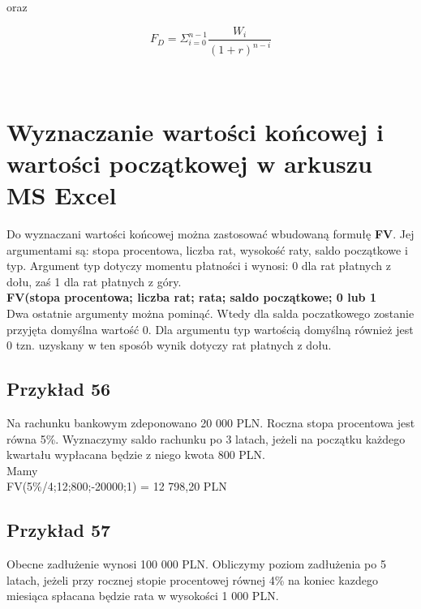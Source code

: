 \documentclass{article}
\begin{document}
oraz\\

\begin{center}
	\begin{equation}
		F_D = \Sigma ^{n-1}_{i=0} \frac{W_i}{(1 + r)^{n-i}}
	\end{equation}
\end{center}\\

\newpage 

\section{Wyznaczanie wartości końcowej i wartości początkowej w arkuszu MS Excel}

Do wyznaczani wartości końcowej można zastosować wbudowaną formułę \textbf{FV}. Jej argumentami są: stopa procentowa, liczba rat, wysokość raty, saldo początkowe i typ. Argument typ dotyczy momentu płatności i wynosi: 0 dla rat płatnych z dołu, zaś 1 dla rat płatnych z góry.\\

\textbf{FV(stopa procentowa; liczba rat; rata; saldo początkowe; 0 lub 1}\\

Dwa ostatnie argumenty można pominąć. Wtedy dla salda poczatkowego zostanie przyjęta domyślna wartość 0. Dla argumentu typ wartością domyślną również jest 0 tzn. uzyskany w ten sposób wynik dotyczy rat płatnych z dołu.\\

\subsection{Przykład 56}

Na rachunku bankowym zdeponowano 20 000 PLN. Roczna stopa procentowa jest równa 5\%. Wyznaczymy saldo rachunku po 3 latach, jeżeli na początku każdego kwartału wypłacana będzie z niego kwota 800 PLN.\\

Mamy\\

FV(5\%/4;12;800;-20000;1) = 12 798,20 PLN\\

\subsection{Przykład 57}

Obecne zadłużenie wynosi 100 000 PLN. Obliczymy poziom zadłużenia po 5 latach, jeżeli przy rocznej stopie procentowej równej 4\% na koniec kazdego miesiąca spłacana będzie rata w wysokości 1 000 PLN.\\
\end{document}
